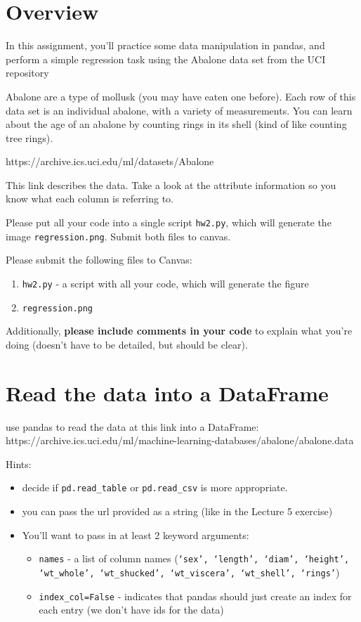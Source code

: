 \documentclass{article}
\begin{document}
\pagestyle{fancy}

\section*{Overview}

In this assignment, you'll practice some data manipulation in pandas, and perform a simple regression task using the Abalone data set from the UCI repository

Abalone are a type of mollusk (you may have eaten one before).  Each row of this data set is an individual abalone, with a variety of measurements.  You can learn about the age of an abalone by counting rings in its shell (kind of like counting tree rings).

https://archive.ics.uci.edu/ml/datasets/Abalone

This link describes the data.  Take a look at the attribute information so you know what each column is referring to.

Please put all your code into a single script {\tt hw2.py}, which will generate the image {\tt regression.png}.  Submit both files to canvas.

Please submit the following files to Canvas:
\begin{enumerate}
\item {\tt hw2.py} - a script with all your code, which will generate the figure
\item {\tt regression.png}
\end{enumerate}

 Additionally, {\bf please include comments in your code} to explain what you're doing (doesn't have to be detailed, but should be clear).


\section{Read the data into a DataFrame}

use pandas to read the data at this link into a DataFrame:\\ https://archive.ics.uci.edu/ml/machine-learning-databases/abalone/abalone.data

Hints:
\begin{itemize}
\item decide if {\tt pd.read\_table} or {\tt pd.read\_csv} is more appropriate.
\item you can pass the url provided as a string (like in the Lecture 5 exercise)
\item You'll want to pass in at least 2 keyword arguments:
\begin{itemize}
\item {\tt names} - a list of column names ({\tt `sex', `length', `diam', `height', `wt\_whole', `wt\_shucked', `wt\_viscera', `wt\_shell', `rings'})
\item {\tt index\_col=False} - indicates that pandas should just create an index for each entry (we don't have ids for the data)
\end{itemize}
\end{itemize}
\end{document}
